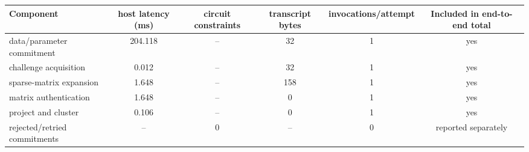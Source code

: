 \begin{tabular}{lccccc}
\toprule
Component & host latency (ms) & circuit constraints & transcript bytes & invocations/attempt & Included in end-to-end total \\
\midrule
data/parameter commitment & 204.118 & -- & 32 & 1 & yes \\
challenge acquisition & 0.012 & -- & 32 & 1 & yes \\
sparse-matrix expansion & 1.648 & -- & 158 & 1 & yes \\
matrix authentication & 1.648 & -- & 0 & 1 & yes \\
project and cluster & 0.106 & -- & 0 & 1 & yes \\
rejected/retried commitments & -- & 0 & -- & 0 & reported separately \\
\bottomrule
\end{tabular}
